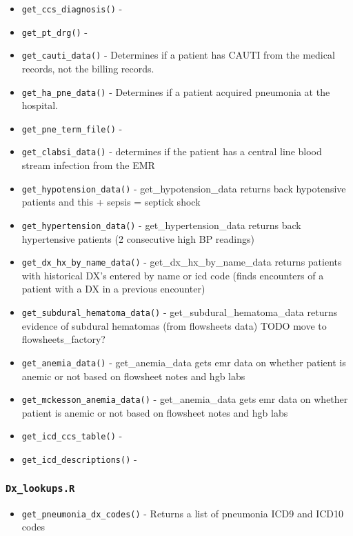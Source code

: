\documentclass[
]{book}
\providecommand{\tightlist}{%
  \setlength{\itemsep}{0pt}\setlength{\parskip}{0pt}}
\begin{document}
\begin{itemize}
\tightlist
\item
  \texttt{get\_ccs\_diagnosis()} -
\item
  \texttt{get\_pt\_drg()} -
\item
  \texttt{get\_cauti\_data()} - Determines if a patient has CAUTI from the medical records, not the billing records.
\item
  \texttt{get\_ha\_pne\_data()} - Determines if a patient acquired pneumonia at the hospital.
\item
  \texttt{get\_pne\_term\_file()} -
\item
  \texttt{get\_clabsi\_data()} - determines if the patient has a central line blood stream infection from the EMR
\item
  \texttt{get\_hypotension\_data()} - get\_hypotension\_data returns back hypotensive patients and this + sepsis = septick shock
\item
  \texttt{get\_hypertension\_data()} - get\_hypertension\_data returns back hypertensive patients (2 consecutive high BP readings)
\item
  \texttt{get\_dx\_hx\_by\_name\_data()} - get\_dx\_hx\_by\_name\_data returns patients with historical DX's entered by name or icd code (finds encounters of a patient with a DX in a previous encounter)
\item
  \texttt{get\_subdural\_hematoma\_data()} - get\_subdural\_hematoma\_data returns evidence of subdural hematomas (from flowsheets data) TODO move to flowsheets\_factory?
\item
  \texttt{get\_anemia\_data()} - get\_anemia\_data gets emr data on whether patient is anemic or not based on flowsheet notes and hgb labs
\item
  \texttt{get\_mckesson\_anemia\_data()} - get\_anemia\_data gets emr data on whether patient is anemic or not based on flowsheet notes and hgb labs
\item
  \texttt{get\_icd\_ccs\_table()} -
\item
  \texttt{get\_icd\_descriptions()} -
\end{itemize}

\hypertarget{dx_lookups.r}{%
\subsubsection{\texorpdfstring{\texttt{Dx\_lookups.R}}{Dx\_lookups.R}}\label{dx_lookups.r}}

\begin{itemize}
\tightlist
\item
  \texttt{get\_pneumonia\_dx\_codes()} - Returns a list of pneumonia ICD9 and ICD10 codes
\end{itemize}
\end{document}
